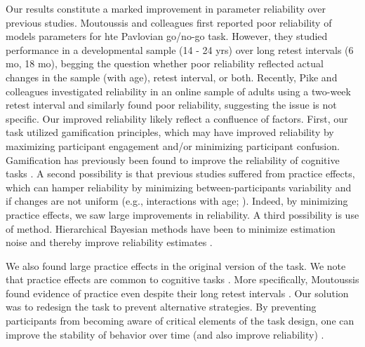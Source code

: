 \documentclass[a4paper,12pt]{article}
\begin{document}
\begin{refsection}[main]
Our results constitute a marked improvement in parameter reliability over previous studies. Moutoussis and colleagues \cite{moutoussis2018change} first reported poor reliability of models parameters for hte Pavlovian go/no-go task. However, they studied performance in a developmental sample (14 - 24 yrs) over long retest intervals (6 mo, 18 mo), begging the question whether poor reliability reflected actual changes in the sample (with age), retest interval, or both. Recently, Pike and colleagues \cite{pike2022test} investigated reliability in an online sample of adults using a two-week retest interval and similarly found poor reliability, suggesting the issue is not specific. Our improved reliability likely reflect a confluence of factors. First, our task utilized gamification principles, which may have improved reliability by maximizing participant engagement and/or minimizing participant confusion. Gamification has previously been found to improve the reliability of cognitive tasks \cite{kucina2022solution, verdejo2021unified}. A second possibility is that previous studies suffered from practice effects, which can hamper reliability by minimizing between-participants variability and if changes are not uniform (e.g., interactions with age; \cite{anokhin2022age}). Indeed, by minimizing practice effects, we saw large improvements in reliability. A third possibility is use of method. Hierarchical Bayesian methods have been to minimize estimation noise and thereby improve reliability estimates \cite{brown2020improving, waltmann2022sufficient}. 

We also found large practice effects in the original version of the task. We note that practice effects are common to cognitive tasks \cite{hausknecht2007retesting, scharfen2018retest}. More specifically, Moutoussis found evidence of practice even despite their long retest intervals \cite{moutoussis2018change}. Our solution was to redesign the task to prevent alternative strategies. By preventing participants from becoming aware of critical elements of the task design, one can improve the stability of behavior over time (and also improve reliability) \cite{mclean2018towards}. 



\end{refsection}
\end{document}
